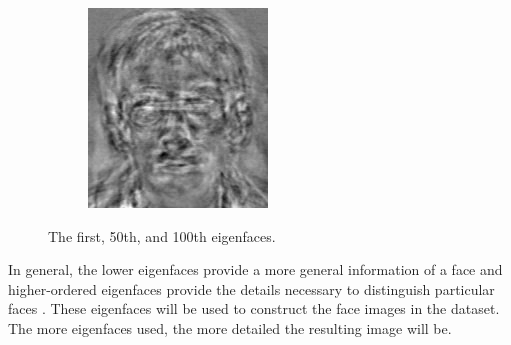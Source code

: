 \begin{figure}[H]
\begin{subfigure}{.32\textwidth}
\end{subfigure}
%
\begin{subfigure}{.32\textwidth}
    \centering
    \includegraphics[width=\textwidth]{figures/eigenface99.png}
\end{subfigure}
\caption{The first, 50th, and 100th eigenfaces.}
\label{fig:facerec-eigenfaces}
\end{figure}

In general, the lower eigenfaces provide a more general information of a face and higher-ordered eigenfaces provide the details necessary to distinguish particular faces \cite{muller2004singular}.
These eigenfaces will be used to construct the face images in the dataset.
The more eigenfaces used, the more detailed the resulting image will be.

